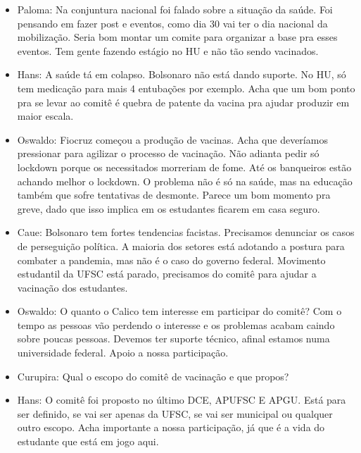 \documentclass{ata-calico}
\begin{document}
\maketitle


\begin{itemize}

    \item Paloma: Na conjuntura nacional foi falado sobre a situação da saúde. Foi pensando em fazer post e eventos, como dia 30 vai ter o dia nacional da mobilização. Seria bom montar um comite para organizar a base pra esses eventos. Tem gente fazendo estágio no HU e não tão sendo vacinados.

    \item Hans: A saúde tá em colapso. Bolsonaro não está dando suporte. No HU, só tem medicação para mais 4 entubações por exemplo. Acha que um bom ponto pra se levar ao comitê é quebra de patente da vacina pra ajudar produzir em maior escala.
    
    \item Oswaldo: Fiocruz começou a produção de vacinas. Acha que deveríamos pressionar para agilizar o processo de vacinação. Não adianta pedir só lockdown porque os necessitados morreriam de fome. Até os banqueiros estão achando melhor o lockdown. O problema não é só na saúde, mas na educação também que sofre tentativas de desmonte. Parece um bom momento pra greve, dado que isso implica em os estudantes ficarem em casa seguro.
    
    \item Caue: Bolsonaro tem fortes tendencias facistas. Precisamos denunciar os casos de perseguição política. A maioria dos setores está adotando a postura para combater a pandemia, mas não é o caso do governo federal. Movimento estudantil da UFSC está parado, precisamos do comitê para ajudar a vacinação dos estudantes.
    
    \item Oswaldo: O quanto o Calico tem interesse em participar do comitê? Com o tempo as pessoas vão perdendo o interesse e os problemas acabam caindo sobre poucas pessoas. Devemos ter suporte técnico, afinal estamos numa universidade federal. Apoio a nossa participação.
    
    \item Curupira: Qual o escopo do comitê de vacinação e que propos?
    
    \item Hans: O comitê foi proposto no último DCE, APUFSC E APGU. Está para ser definido, se vai ser apenas da UFSC, se vai ser municipal ou qualquer outro escopo. Acha importante a nossa participação, já que é a vida do estudante que está em jogo aqui.
    

\end{itemize}
\end{document}

